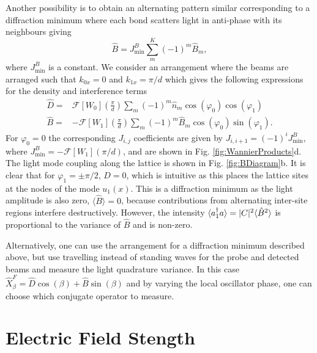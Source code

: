 Another possibility is to obtain an alternating pattern similar
corresponding to a diffraction minimum where each bond scatters light
in anti-phase with its neighbours giving
\begin{equation}
  \hat{B} = J^B_\mathrm{min} \sum_m^K (-1)^m \hat{B}_m,
\end{equation}
where $J^B_\mathrm{min}$ is a constant. We consider an arrangement
where the beams are arranged such that $k_{0x} = 0$ and
$k_{1x} = \pi/d$ which gives the following expressions for the density
and interference terms
\begin{align}
  \label{eq:DMin}
  \hat{D} = & \mathcal{F}[W_0]\left(\frac{\pi}{d}\right) \sum_m (-1)^m \hat{n}_m
              \cos(\varphi_0) \cos(\varphi_1) \nonumber \\ 
  \hat{B} = & -\mathcal{F}[W_1]\left(\frac{\pi}{d}\right) \sum_m (-1)^m \hat{B}_m
              \cos(\varphi_0) \sin(\varphi_1).
\end{align}
For $\varphi_0 = 0$ the corresponding $J_{i,j}$ coefficients are given
by $J_{i,i+1} = (-1)^i J^B_\mathrm{min}$, where
$J^B_\mathrm{min} = -\mathcal{F}[W_1](\pi / d)$, and are shown in
Fig. \ref{fig:WannierProducts}d. The light mode coupling along the
lattice is shown in Fig. \ref{fig:BDiagram}b. It is clear that for
$\varphi_1 = \pm \pi/2$, $\hat{D} = 0$, which is intuitive as this
places the lattice sites at the nodes of the mode $u_1(x)$. This is a
diffraction minimum as the light amplitude is also zero,
$\langle \hat{B} \rangle = 0$, because contributions from alternating
inter-site regions interfere destructively. However, the intensity
$\langle a^\dagger_1 a \rangle = |C|^2 \langle \hat{B}^2 \rangle$ is
proportional to the variance of $\hat{B}$ and is non-zero.

Alternatively, one can use the arrangement for a diffraction minimum
described above, but use travelling instead of standing waves for the
probe and detected beams and measure the light quadrature variance.
In this case
$\hat{X}^F_\beta = \hat{D} \cos(\beta) + \hat{B} \sin(\beta)$ and by
varying the local oscillator phase, one can choose which conjugate
operator to measure.

\section{Electric Field Stength}
\label{sec:Efield}

